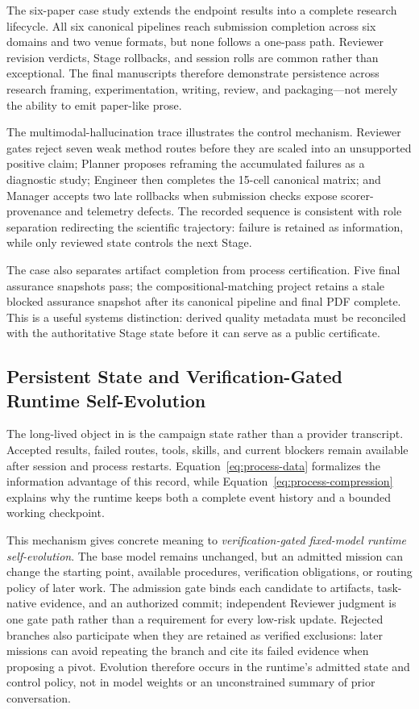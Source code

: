 The six-paper case study extends the endpoint results into a complete research
lifecycle. All six canonical pipelines reach submission completion across six
domains and two venue formats, but none follows a one-pass path. Reviewer revision
verdicts, Stage rollbacks, and session rolls are common rather than exceptional.
The final manuscripts therefore demonstrate persistence across research framing,
experimentation, writing, review, and packaging---not merely the ability to emit
paper-like prose.

The multimodal-hallucination trace illustrates the control mechanism. Reviewer
gates reject seven weak method routes before they are scaled into an unsupported
positive claim; Planner proposes reframing the accumulated failures as a diagnostic study;
Engineer then completes the 15-cell canonical matrix; and Manager accepts two late
rollbacks when submission checks expose scorer-provenance and telemetry defects.
The recorded sequence is consistent with role separation redirecting the scientific
trajectory: failure is
retained as information, while only reviewed state controls the next Stage.

The case also separates artifact completion from process certification. Five final
assurance snapshots pass; the compositional-matching project retains a stale blocked
assurance snapshot after its canonical pipeline and final PDF complete. This is a
useful systems distinction: derived quality metadata must be reconciled with the
authoritative Stage state before it can serve as a public certificate.

\subsection{Persistent State and Verification-Gated Runtime Self-Evolution}

The long-lived object in \systemname is the campaign state rather than a provider
transcript. Accepted results, failed routes, tools, skills, and current blockers
remain available after session and process restarts. Equation~\ref{eq:process-data}
formalizes the information advantage of this record, while
Equation~\ref{eq:process-compression} explains why the runtime keeps both a complete
event history and a bounded working checkpoint.

This mechanism gives concrete meaning to \emph{verification-gated fixed-model runtime
self-evolution}. The base model remains unchanged, but an admitted mission can
change the starting point, available procedures, verification obligations, or
routing policy of later work. The admission gate binds each candidate to artifacts,
task-native evidence, and an authorized commit; independent Reviewer judgment is one
gate path rather than a requirement for every low-risk update. Rejected branches
also participate when they are retained as verified exclusions: later missions can
avoid repeating the branch and cite its failed evidence when proposing a pivot.
Evolution therefore occurs in the runtime's admitted state and control policy, not
in model weights or an unconstrained summary of prior conversation.

